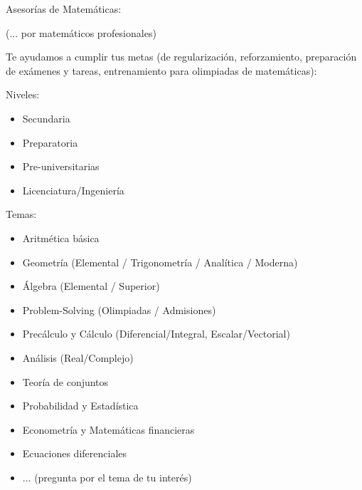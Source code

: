 \documentclass{article}
\begin{document}
{\Huge Asesorías de Matemáticas:} 
\vspace{.5cm}

{\large (... por matemáticos profesionales)}
\vspace{.5cm}

Te ayudamos a cumplir tus metas (de regularización, reforzamiento, preparación de exámenes y tareas, entrenamiento para olimpiadas de matemáticas):
\vspace{.5cm}

{\Large Niveles:} 
\begin{itemize}
    \item Secundaria 
    \item Preparatoria
    \item Pre-universitarias
    \item Licenciatura/Ingeniería
\end{itemize}

{\Large Temas:}
\begin{itemize}
    \item Aritmética básica
    \item Geometría (Elemental / Trigonometría / Analítica / Moderna)
    \item Álgebra (Elemental / Superior)
    \item Problem-Solving (Olimpiadas / Admisiones)
    \item Precálculo y Cálculo (Diferencial/Integral, Escalar/Vectorial)
    \item Análisis (Real/Complejo)
    \item Teoría de conjuntos
    \item Probabilidad y Estadística
    \item Econometría y Matemáticas financieras
    \item Ecuaciones diferenciales
    \item ... (pregunta por el tema de tu interés) 
\end{itemize}
\end{document}
